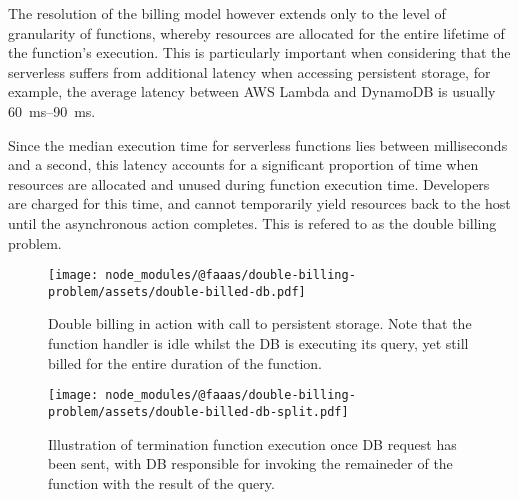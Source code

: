 The resolution of the billing model however extends only to the level of granularity of functions, whereby resources are allocated for the entire lifetime of the function's execution. This is particularly important when considering that the serverless suffers from additional latency when accessing persistent storage, for example, the average latency between AWS Lambda and DynamoDB is usually \qtyrange{60}{90}{\ms}\cite{ghoshCachingTechniquesImprove2020}.

Since the median execution time for serverless functions lies between milliseconds and a second\cite{eismannReviewServerlessUse2020}, this latency accounts for a significant proportion of time when resources are allocated and unused during function execution time. Developers are charged for this time, and cannot temporarily yield resources back to the host until the asynchronous action completes. This is refered to as the double billing problem\cite{baldiniServerlessTrilemmaFunction2017,yuCharacterizingServerlessPlatforms2020}.

\begin{figure}[t]
    \texttt{[image: node\_modules/@faaas/double-billing-problem/assets/double-billed-db.pdf]}
    \caption{Double billing in action with call to persistent storage. Note that the function handler is idle whilst the DB is executing its query, yet still billed for the entire duration of the function.}
    \label{fig:double-billing-db}
\end{figure}

\begin{figure}[t]
    \texttt{[image: node\_modules/@faaas/double-billing-problem/assets/double-billed-db-split.pdf]}
    \caption{Illustration of termination function execution once DB request has been sent, with DB responsible for invoking the remaineder of the function with the result of the query.}
    \label{fig:double-billing-db-split}
\end{figure}
